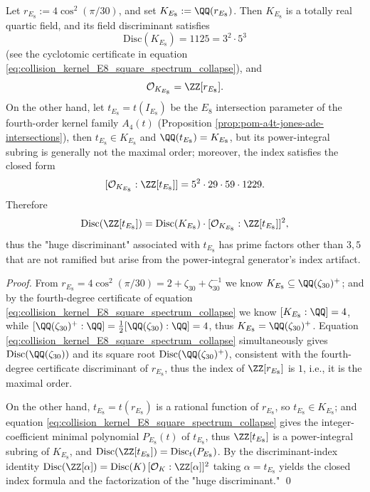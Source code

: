 \begin{proposition}\label{prop:pom-e8-intersection-field-discriminant-index}
Let \(r_{E_8}:=4\cos^2(\pi/30)\), and set \(K_{E_8}:=\QQ(r_{E_8})\).
Then \(K_{E_8}\) is a totally real quartic field, and its field discriminant satisfies
\[
\mathrm{Disc}(K_{E_8})=1125=3^2\cdot 5^3
\]
(see the cyclotomic certificate in equation \eqref{eq:collision_kernel_E8_square_spectrum_collapse}), and
\[
\mathcal O_{K_{E_8}}=\ZZ[r_{E_8}].
\]
On the other hand, let \(t_{E_8}=t(I_{E_8})\) be the \(E_8\) intersection parameter of the fourth-order kernel family \(A_4(t)\) (Proposition \ref{prop:pom-a4t-jones-ade-intersections}), then \(t_{E_8}\in K_{E_8}\) and \(\QQ(t_{E_8})=K_{E_8}\), but its power-integral subring is generally not the maximal order;
moreover, the index satisfies the closed form
\[
[\mathcal O_{K_{E_8}}:\ZZ[t_{E_8}]]=5^2\cdot 29\cdot 59\cdot 1229.
\]
Therefore
\[
\mathrm{Disc}(\ZZ[t_{E_8}])=\mathrm{Disc}(K_{E_8})\cdot[\mathcal O_{K_{E_8}}:\ZZ[t_{E_8}]]^{2},
\]
thus the "huge discriminant" associated with \(t_{E_8}\) has prime factors other than \(3,5\) that are not ramified but arise from the power-integral generator's index artifact.
\end{proposition}
\begin{proof}
From \(r_{E_8}=4\cos^2(\pi/30)=2+\zeta_{30}+\zeta_{30}^{-1}\) we know \(K_{E_8}\subseteq \QQ(\zeta_{30})^+\);
and by the fourth-degree certificate of equation \eqref{eq:collision_kernel_E8_square_spectrum_collapse} we know \([K_{E_8}:\QQ]=4\), while \([\QQ(\zeta_{30})^+:\QQ]=\tfrac12[\QQ(\zeta_{30}):\QQ]=4\), thus \(K_{E_8}=\QQ(\zeta_{30})^+\).
Equation \eqref{eq:collision_kernel_E8_square_spectrum_collapse} simultaneously gives \(\mathrm{Disc}(\QQ(\zeta_{30}))\) and its square root \(\mathrm{Disc}(\QQ(\zeta_{30})^+)\), consistent with the fourth-degree certificate discriminant of \(r_{E_8}\), thus the index of \(\ZZ[r_{E_8}]\) is \(1\), i.e., it is the maximal order.
\par
On the other hand, \(t_{E_8}=t(r_{E_8})\) is a rational function of \(r_{E_8}\), so \(t_{E_8}\in K_{E_8}\); and equation \eqref{eq:collision_kernel_E8_square_spectrum_collapse} gives the integer-coefficient minimal polynomial \(P_{E_8}(t)\) of \(t_{E_8}\), thus \(\ZZ[t_{E_8}]\) is a power-integral subring of \(K_{E_8}\), and
\(\mathrm{Disc}(\ZZ[t_{E_8}])=\mathrm{Disc}_t(P_{E_8})\).
By the discriminant-index identity
\(
\mathrm{Disc}(\ZZ[\alpha])=\mathrm{Disc}(K)\,[\mathcal O_K:\ZZ[\alpha]]^2
\)
taking \(\alpha=t_{E_8}\) yields the closed index formula and the factorization of the "huge discriminant." \qed
\end{proof}

